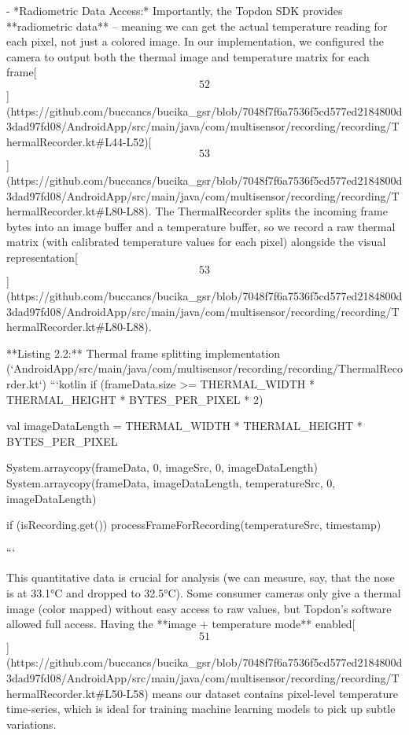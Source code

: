 \documentclass[12pt,a4paper]{article}
\begin{document}
- *Radiometric Data Access:* Importantly, the Topdon SDK provides
  **radiometric data** -- meaning we can get the actual temperature
  reading for each pixel, not just a colored image. In our
  implementation, we configured the camera to output both the thermal
  image and temperature matrix for each
  frame[\[52\]](https://github.com/buccancs/bucika_gsr/blob/7048f7f6a7536f5cd577ed2184800d3dad97fd08/AndroidApp/src/main/java/com/multisensor/recording/recording/ThermalRecorder.kt#L44-L52)[\[53\]](https://github.com/buccancs/bucika_gsr/blob/7048f7f6a7536f5cd577ed2184800d3dad97fd08/AndroidApp/src/main/java/com/multisensor/recording/recording/ThermalRecorder.kt#L80-L88).
  The ThermalRecorder splits the incoming frame bytes into an image
  buffer and a temperature buffer, so we record a raw thermal matrix
  (with calibrated temperature values for each pixel) alongside the
  visual
  representation[\[53\]](https://github.com/buccancs/bucika_gsr/blob/7048f7f6a7536f5cd577ed2184800d3dad97fd08/AndroidApp/src/main/java/com/multisensor/recording/recording/ThermalRecorder.kt#L80-L88).
  
**Listing 2.2:** Thermal frame splitting implementation (`AndroidApp/src/main/java/com/multisensor/recording/recording/ThermalRecorder.kt`)
```kotlin
if (frameData.size >= THERMAL_WIDTH * THERMAL_HEIGHT * BYTES_PER_PIXEL * 2) {
    val imageDataLength = THERMAL_WIDTH * THERMAL_HEIGHT * BYTES_PER_PIXEL

    System.arraycopy(frameData, 0, imageSrc, 0, imageDataLength)
    System.arraycopy(frameData, imageDataLength, temperatureSrc, 0, imageDataLength)

    if (isRecording.get()) {
        processFrameForRecording(temperatureSrc, timestamp)
    }
}
```

  This quantitative data is crucial for analysis (we can measure, say,
  that the nose is at 33.1°C and dropped to 32.5°C). Some consumer
  cameras only give a thermal image (color mapped) without easy access
  to raw values, but Topdon's software allowed full access. Having the
  **image + temperature mode**
  enabled[\[51\]](https://github.com/buccancs/bucika_gsr/blob/7048f7f6a7536f5cd577ed2184800d3dad97fd08/AndroidApp/src/main/java/com/multisensor/recording/recording/ThermalRecorder.kt#L50-L58)
  means our dataset contains pixel-level temperature time-series, which
  is ideal for training machine learning models to pick up subtle
  variations.
\end{document}
